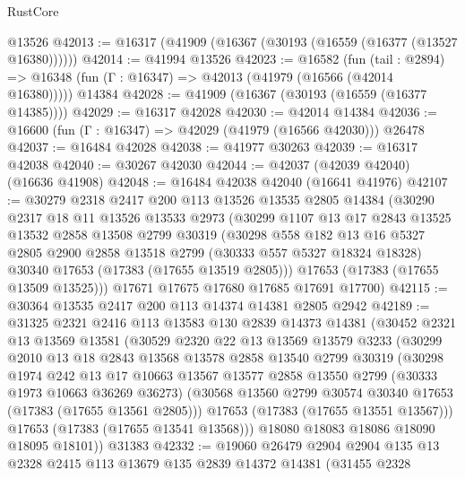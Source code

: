 \begin{lexlean}{RustCore}
\begin{coremodule}
    @13526
@42013 := @16317 (@41909 (@16367 (@30193 (@16559 (@16377 (@13527 @16380))))))
@42014 := @41994 @13526
@42023 := @16582
    (fun (tail : @2894) => @16348 (fun (Γ : @16347) => @42013 (@41979 (@16566 (@42014 @16380)))))
    @14384
@42028 := @41909 (@16367 (@30193 (@16559 (@16377 @14385))))
@42029 := @16317 @42028
@42030 := @42014 @14384
@42036 := @16600 (fun (Γ : @16347) => @42029 (@41979 (@16566 @42030))) @26478
@42037 := @16484 @42028
@42038 := @41977 @30263
@42039 := @16317 @42038
@42040 := @30267 @42030
@42044 := @42037 (@42039 @42040) (@16636 @41908)
@42048 := @16484 @42038 @42040 (@16641 @41976)
@42107 := @30279
    @2318
    @2417
    @200
    @113
    @13526
    @13535
    @2805
    @14384
    (@30290
      @2317
      @18
      @11
      @13526
      @13533
      @2973
      (@30299
        @1107
        @13
        @17
        @2843
        @13525
        @13532
        @2858
        @13508
        @2799
        @30319
        (@30298
          @558
          @182
          @13
          @16
          @5327
          @2805
          @2900
          @2858
          @13518
          @2799
          (@30333 @557 @5327 @18324 @18328)
          @30340
          @17653
          (@17383 (@17655 @13519 @2805)))
        @17653
        (@17383 (@17655 @13509 @13525)))
      @17671
      @17675
      @17680
      @17685
      @17691
      @17700)
@42115 := @30364 @13535 @2417 @200 @113 @14374 @14381 @2805 @2942
@42189 := @31325
    @2321
    @2416
    @113
    @13583
    @130
    @2839
    @14373
    @14381
    (@30452
      @2321
      @13
      @13569
      @13581
      (@30529
        @2320
        @22
        @13
        @13569
        @13579
        @3233
        (@30299
          @2010
          @13
          @18
          @2843
          @13568
          @13578
          @2858
          @13540
          @2799
          @30319
          (@30298
            @1974
            @242
            @13
            @17
            @10663
            @13567
            @13577
            @2858
            @13550
            @2799
            (@30333 @1973 @10663 @36269 @36273)
            (@30568 @13560 @2799 @30574 @30340 @17653 (@17383 (@17655 @13561 @2805)))
            @17653
            (@17383 (@17655 @13551 @13567)))
          @17653
          (@17383 (@17655 @13541 @13568)))
        @18080
        @18083
        @18086
        @18090
        @18095
        @18101))
    @31383
@42332 := @19060
    @26479
    @2904
    @2904
    @135
    @13
    @2328
    @2415
    @113
    @13679
    @135
    @2839
    @14372
    @14381
    (@31455
      @2328

\end{coremodule}
\end{lexlean}
